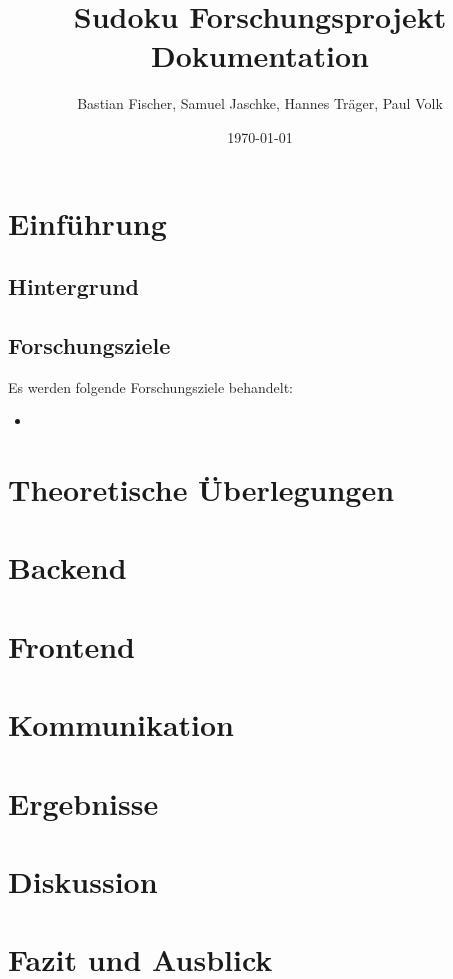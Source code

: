 \documentclass[12pt,a4paper]{article}
\title{Sudoku Forschungsprojekt Dokumentation}
\author{Bastian Fischer, Samuel Jaschke, Hannes Träger, Paul Volk}
\date{\today}
\begin{document}
\maketitle

\begin{abstract}
\end{abstract}

\section{Einführung}
\subsection{Hintergrund}

\subsection{Forschungsziele}
Es werden folgende Forschungsziele behandelt:
\begin{itemize}
    \item  
\end{itemize}

\section{Theoretische Überlegungen}



\section{Backend}


\section{Frontend}


\section{Kommunikation}


\section{Ergebnisse}

\section{Diskussion}

\section{Fazit und Ausblick}





\end{document}

